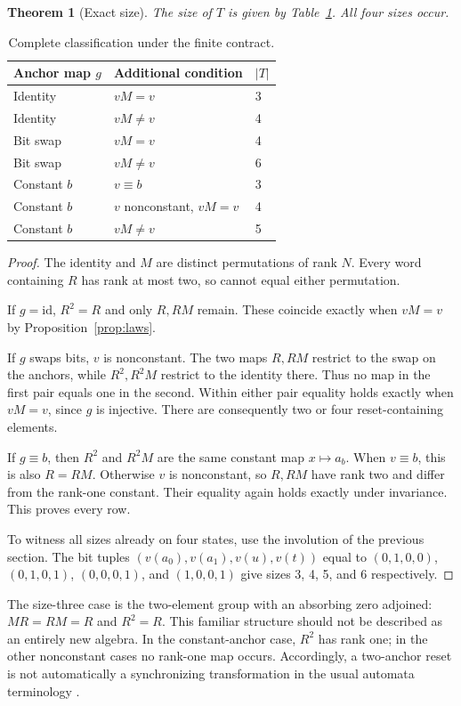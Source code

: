 \documentclass[11pt,a4paper]{article}
\newtheorem{theorem}{Theorem}[section]
\newcommand{\id}{\mathrm{id}}
\begin{document}
\begin{theorem}[Exact size]\label{thm:size}
The size of $T$ is given by Table~\ref{tab:size}. All four sizes occur.
\end{theorem}
\begin{table}[ht]
\centering
\begin{tabular}{lll}
\toprule
Anchor map $g$ & Additional condition & $|T|$\\
\midrule
Identity & $vM=v$ & 3\\
Identity & $vM\ne v$ & 4\\
Bit swap & $vM=v$ & 4\\
Bit swap & $vM\ne v$ & 6\\
Constant $b$ & $v\equiv b$ & 3\\
Constant $b$ & $v$ nonconstant, $vM=v$ & 4\\
Constant $b$ & $vM\ne v$ & 5\\
\bottomrule
\end{tabular}
\caption{Complete classification under the finite contract.}\label{tab:size}
\end{table}
\begin{proof}
The identity and $M$ are distinct permutations of rank $N$. Every word containing $R$ has rank at most two, so cannot equal either permutation.

If $g=\id$, $R^2=R$ and only $R,RM$ remain. These coincide exactly when $vM=v$ by Proposition~\ref{prop:laws}.

If $g$ swaps bits, $v$ is nonconstant. The two maps $R,RM$ restrict to the swap on the anchors, while $R^2,R^2M$ restrict to the identity there. Thus no map in the first pair equals one in the second. Within either pair equality holds exactly when $vM=v$, since $g$ is injective. There are consequently two or four reset-containing elements.

If $g\equiv b$, then $R^2$ and $R^2M$ are the same constant map $x\mapsto a_b$. When $v\equiv b$, this is also $R=RM$. Otherwise $v$ is nonconstant, so $R,RM$ have rank two and differ from the rank-one constant. Their equality again holds exactly under invariance. This proves every row.

To witness all sizes already on four states, use the involution of the previous section. The bit tuples $(v(a_0),v(a_1),v(u),v(t))$ equal to $(0,1,0,0)$, $(0,1,0,1)$, $(0,0,0,1)$, and $(1,0,0,1)$ give sizes 3, 4, 5, and 6 respectively.
\end{proof}

The size-three case is the two-element group with an absorbing zero adjoined: $MR=RM=R$ and $R^2=R$. This familiar structure should not be described as an entirely new algebra. In the constant-anchor case, $R^2$ has rank one; in the other nonconstant cases no rank-one map occurs. Accordingly, a two-anchor reset is not automatically a synchronizing transformation in the usual automata terminology \cite{volkov}.
\end{document}
